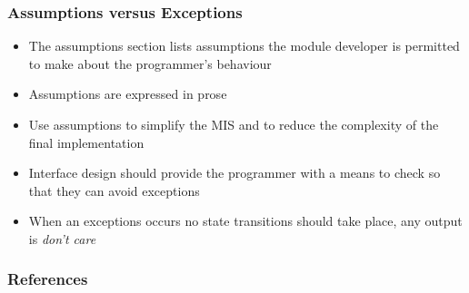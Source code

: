 \documentclass[t, 12pt, numbers, fleqn, handout]{beamer}
\begin{document}

\begin{frame}

\frametitle{Assumptions versus Exceptions}

\begin{itemize}
\item The assumptions section lists assumptions the module developer is permitted to make about the programmer's behaviour
\item Assumptions are expressed in prose
\item Use assumptions to simplify the MIS and to reduce the complexity of the final implementation
\item Interface design should provide the programmer with a means to check so that they can avoid exceptions
\item When an exceptions occurs no state transitions should take place, any output is {\it don't care}
\end{itemize}

\end{frame}


\begin{frame}[allowframebreaks]
\frametitle{References}



\end{frame}

\end{document}
